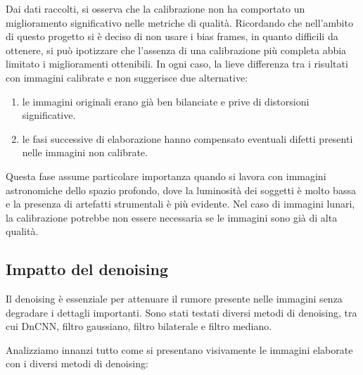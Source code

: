 Dai dati raccolti, si osserva che la calibrazione non ha comportato un miglioramento significativo nelle metriche di qualità. Ricordando che nell'ambito di questo progetto si è deciso di non usare i bias frames, in quanto difficili da ottenere, si può ipotizzare che l'assenza di una calibrazione più completa abbia limitato i miglioramenti ottenibili. In ogni caso, la lieve differenza tra i risultati con immagini calibrate e non suggerisce due alternative:
\begin{enumerate}
    \item le immagini originali erano già ben bilanciate e prive di distorsioni significative.
    \item le fasi successive di elaborazione hanno compensato eventuali difetti presenti nelle immagini non calibrate.
\end{enumerate}

Questa fase assume particolare importanza quando si lavora con immagini astronomiche dello spazio profondo, dove la luminosità dei soggetti è molto bassa e la presenza di artefatti strumentali è più evidente. Nel caso di immagini lunari, la calibrazione potrebbe non essere necessaria se le immagini sono già di alta qualità.

\subsection{Impatto del denoising} \label{subsec:analysis_den}

Il denoising è essenziale per attenuare il rumore presente nelle immagini senza degradare i dettagli importanti. Sono stati testati diversi metodi di denoising, tra cui DnCNN, filtro gaussiano, filtro bilaterale e filtro mediano.

Analizziamo innanzi tutto come si presentano visivamente le immagini elaborate con i diversi metodi di denoising:

